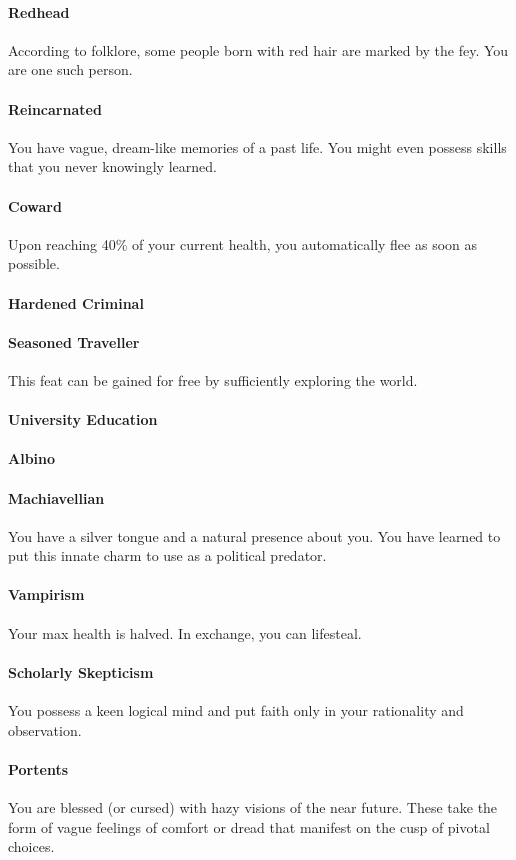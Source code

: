    \paragraph{Redhead} According to folklore, some people born with red hair are marked by the fey. You are one such person. 
    \paragraph{Reincarnated} You have vague, dream-like memories of a past life. You might even possess skills that you never knowingly learned.
    \paragraph{Coward} Upon reaching 40\% of your current health, you automatically flee as soon as possible.
    \paragraph{Hardened Criminal}
    \paragraph{Seasoned Traveller} This feat can be gained for free by sufficiently exploring the world. 
    \paragraph{University Education}
    \paragraph{Albino}
    \paragraph{Machiavellian} You have a silver tongue and a natural presence about you. You have learned to put this innate charm to use as a political predator. 
    \paragraph{Vampirism} Your max health is halved. In exchange, you can lifesteal.
    \paragraph{Scholarly Skepticism} You possess a keen logical mind and put faith only in your rationality and observation. 
    \paragraph{Portents} You are blessed (or cursed) with hazy visions of the near future. These take the form of vague feelings of comfort or dread that manifest on the cusp of pivotal choices. 
